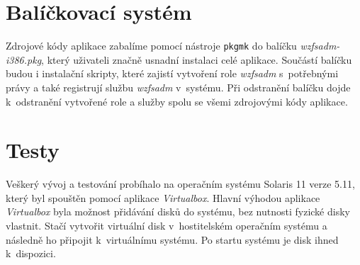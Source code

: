 \section{Balíčkovací systém}
Zdrojové kódy aplikace zabalíme pomocí nástroje \verb|pkgmk| do balíčku \emph{wzfsadm-i386.pkg}, který uživateli značně usnadní instalaci celé aplikace. Součástí balíčku budou i instalační skripty, které zajistí vytvoření role \emph{wzfsadm} s~potřebnými právy a také registrují službu \emph{wzfsadm} v~systému. Při odstranění balíčku dojde k~odstranění vytvořené role a služby spolu se všemi zdrojovými kódy aplikace.
\section{Testy}
Veškerý vývoj a testování probíhalo na operačním systému Solaris 11 verze 5.11, který byl spouštěn pomocí aplikace \emph{Virtualbox}. Hlavní výhodou aplikace \emph{Virtualbox} byla možnost přidávání disků do systému, bez nutnosti fyzické disky vlastnit. Stačí vytvořit virtuální disk v~hostitelském operačním systému a následně ho připojit k~virtuálnímu systému. Po startu systému je disk ihned k~dispozici.


